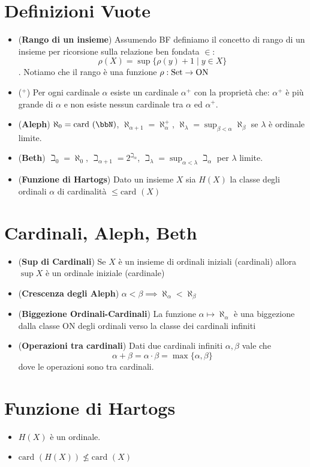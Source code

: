 \documentclass[a4paper,NoNotes,GeneralMath]{stdmdoc}
\newcommand{\card}[1]{\text{card }({#1})}
\newcommand{\Set}{\text{Set}}
\newcommand{\ON}{\text{ON}}
\begin{document}
	\section*{Definizioni Vuote}
	\begin{itemize}
		\item ({\bf Rango di un insieme}) Assumendo BF definiamo il concetto di rango di un insieme per ricorsione sulla relazione ben fondata $\in$: $$ \rho(X) = \sup \{ \rho(y) + 1 \mid y \in X \} $$. Notiamo che il rango è una funzione $\rho: \Set \rar \ON$
		\item ({\bf ${}^{+}$}) Per ogni cardinale $\alpha$ esiste un cardinale $\alpha^{+}$ con la proprietà che: $\alpha^+$ è più grande di $\alpha$ e non esiste nessun cardinale tra $\alpha$ ed $\alpha^+$.
		\item ({\bf Aleph}) $\aleph_0 = \card{\bbN}$, $\aleph_{\alpha + 1} = \aleph_\alpha^{+}$, $\aleph_\lambda = \sup_{\beta < \alpha} \aleph_\beta$ se $\lambda$ è ordinale limite.
		\item ({\bf Beth}) $\beth_0 = \aleph_0$, $\beth_{\alpha + 1} = 2^{\beth_\alpha}$, $\beth_\lambda = \sup_{\alpha < \lambda} \beth_\alpha$ per $\lambda$ limite.
		\item ({\bf Funzione di Hartogs}) Dato un insieme $X$ sia $H(X)$ la classe degli ordinali $\alpha$ di cardinalità $\le \card{X}$
	\end{itemize}
	
	\section*{Cardinali, Aleph, Beth}
	\begin{itemize}
		\item ({\bf Sup di Cardinali}) Se $X$ è un insieme di ordinali iniziali (cardinali) allora $\sup X$ è un ordinale iniziale (cardinale)
		\item ({\bf Crescenza degli Aleph}) $\alpha < \beta \implies \aleph_\alpha < \aleph_\beta$
		\item ({\bf Biggezione Ordinali-Cardinali}) La funzione $\alpha \mapsto \aleph_\alpha$ è una biggezione dalla classe $\ON$ degli ordinali verso la classe dei cardinali infiniti
		\item ({\bf Operazioni tra cardinali}) Dati due cardinali infiniti $\alpha, \beta$ vale che $$ \alpha + \beta = \alpha \cdot \beta = \max \{ \alpha, \beta \} $$ dove le operazioni sono tra cardinali.
	\end{itemize}
	
	\section*{Funzione di Hartogs}
	\begin{itemize}
		\item $H(X)$ è un ordinale.
		\item $\card{H(X)} \not\le \card{X}$
	\end{itemize}
	
\end{document}
